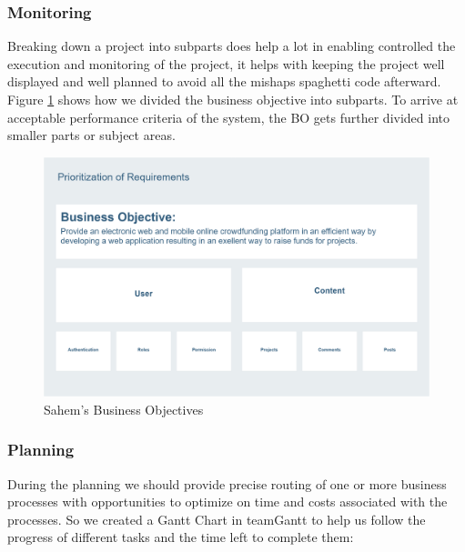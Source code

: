 \subsubsection*{Monitoring}
Breaking down a project into subparts does help a lot in enabling controlled the execution and monitoring of the project, it helps with keeping the project well displayed and well planned to avoid all the mishaps spaghetti code afterward.
Figure \ref{fig:bos} shows how we divided the business objective into subparts. To arrive at acceptable performance criteria of the system, the BO gets further divided into smaller parts or subject areas.
\begin{figure}[!ht]
      \center
      \includegraphics[scale=0.18]{assets/bos.png}
      \caption{Sahem's Business Objectives}
      \label{fig:bos}
\end{figure}

\subsubsection*{Planning}
During the planning we should provide precise routing of one or more business processes with opportunities to optimize on time and costs associated with the processes.
So we created a Gantt Chart in teamGantt to help us follow the progress of different tasks and the time left to complete them:
\clearpage

